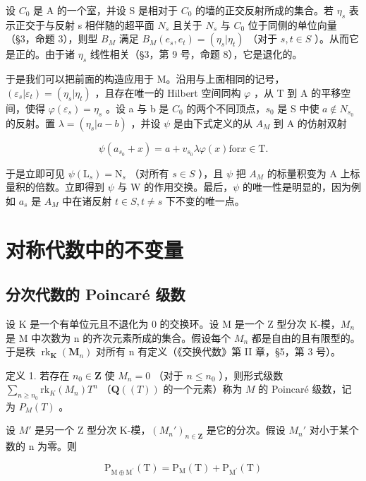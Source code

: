 设 \(C_0\) 是 A 的一个室，并设 S 是相对于 \(C_0\) 的墙的正交反射所成的集合。若 \(\eta_s\) 表示正交于与反射 s 相伴随的超平面 \(N_s\) 且关于 \(N_s\) 与 \(C_0\) 位于同侧的单位向量（§3，命题 3），则型 \(B_M\) 满足 \(B_M(e_s, e_t) = (\eta_s | \eta_t)\) （对于 \(s, t \in S\) ）。从而它是正的。由于诸 \(\eta_s\) 线性相关（§3，第 9 号，命题 8），它是退化的。

于是我们可以把前面的构造应用于 M。沿用与上面相同的记号，\((\varepsilon_{s}|\varepsilon_{t}) = (\eta_{s}|\eta_{t})\) ，且存在唯一的 Hilbert 空间同构 \(\varphi\) ，从 T 到 A 的平移空间，使得 \(\varphi(\varepsilon_{s}) = \eta_{s}\) 。设 a 与 b 是 \(C_{0}\) 的两个不同顶点，\(s_{0}\) 是 S 中使 \(a \notin N_{s_{0}}\) 的反射。置 \(\lambda = (\eta_{s}|a - b)\) ，并设 \(\psi\) 是由下式定义的从 \(A_{M}\) 到 A 的仿射双射

\[
\psi \left(a _ {s _ {0}} + x\right) = a + v _ {s _ {0}} \lambda \varphi (x) \text {for} x \in \mathrm{T}.
\]

于是立即可见 \(\psi(\mathrm{L}_{s}) = \mathrm{N}_{s}\) （对所有 \(s \in S\) ），且 \(\psi\) 把 \(A_{M}\) 的标量积变为 A 上标量积的倍数。立即得到 \(\psi\) 与 W 的作用交换。最后，\(\psi\) 的唯一性是明显的，因为例如 \(a_{s}\) 是 \(A_{M}\) 中在诸反射 \(t \in S, t \neq s\) 下不变的唯一点。

\section{对称代数中的不变量}

\subsection{分次代数的 Poincaré 级数}

设 K 是一个有单位元且不退化为 0 的交换环。设 M 是一个 Z 型分次 K-模，\(M_{n}\) 是 M 中次数为 n 的齐次元素所成的集合。假设每个 \(M_{n}\) 都是自由的且有限型的。于是秩 \(\operatorname{rk}_{\mathbf{K}}(\mathbf{M}_{n})\) 对所有 n 有定义（《交换代数》第 II 章，§5，第 3 号）。

定义 1. 若存在 \(n_0 \in \mathbf{Z}\) 使 \(M_n = 0\) （对于 \(n \leqslant n_0\) ），则形式级数 \(\sum_{n \geqslant n_0} \mathrm{rk}_K(M_n) T^n\) （\(\mathbf{Q}((T))\) 的一个元素）称为 \(M\) 的 Poincaré 级数，记为 \(P_M(T)\) 。

设 \(M'\) 是另一个 Z 型分次 K-模，\((M_n')_{n \in \mathbf{Z}}\) 是它的分次。假设 \(M_n'\) 对小于某个数的 n 为零。则

\[
\mathrm{P} _ {\mathrm{M} \oplus \mathrm{M} ^ {\prime}} (\mathrm{T}) = \mathrm{P} _ {\mathrm{M}} (\mathrm{T}) + \mathrm{P} _ {\mathrm{M} ^ {\prime}} (\mathrm{T})\tag{1}
\]

